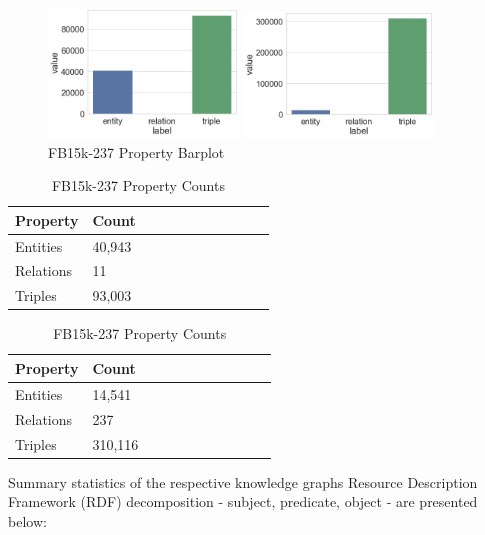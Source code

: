 \begin{figure}[H]
	\parbox{.5\linewidth}{
   		\caption{WN18RR Property Barplot}
   		\centering
    		\includegraphics[width=0.45\textwidth]{WN18RR_Counts}
		}
	\hfill
	\parbox{.5\linewidth}{
		\caption{FB15k-237 Property Barplot}
   		\centering
    		\includegraphics[width=0.45\textwidth]{FB15k-237_Counts}
		}
\end{figure}

\begin{table}[H]
	\parbox{.5\linewidth}{
		\caption{WN18RR Property Counts}
		\centering
		\begin{tabular}{lllllllllll}
  			\textbf{Property} & \textbf{Count}  \\
  			\hline
  			Entities & 40,943  \\
  			Relations & 11  \\
  			Triples & 93,003 \\
		\end{tabular}
		}
	\hfill
	\parbox{.5\linewidth}{
		\caption{FB15k-237 Property Counts}
		\centering
		\begin{tabular}{lllllllllll}
  			\textbf{Property} & \textbf{Count}  \\
  			\hline
  			Entities & 14,541   \\
  			Relations & 237  \\
  			Triples & 310,116  \\
		\end{tabular}
		}
\end{table}

Summary statistics of the respective knowledge graphs Resource Description Framework (RDF) decomposition - subject, predicate, object - are presented below:

